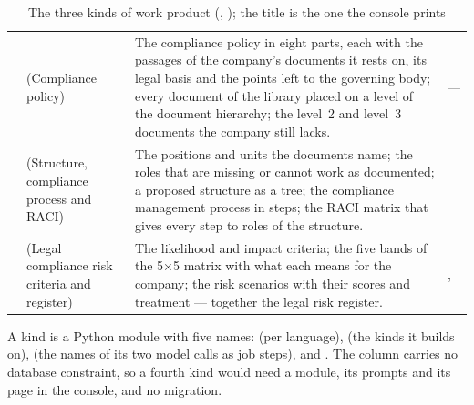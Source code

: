 \begin{table}[H]
\caption{The three kinds of work product (, ); the title is the one the console prints}\label{tab:programme:kinds}
\begin{tabularx}{\textwidth}{@{}L{19mm}L{37mm}YL{17mm}@{}}
\toprule
{} &  &  &  \\
\midrule
{} &  (Compliance policy) &
  The compliance policy in eight parts, each with the passages of the company's documents it
  rests on, its legal basis and the points left to the governing body; every document of the
  library placed on a level of the document hierarchy; the level~2 and level~3 documents the
  company still lacks. & --- \\
 &  (Structure, compliance process and RACI) &
  The positions and units the documents name; the roles that are missing or cannot work as
  documented; a proposed structure as a tree; the compliance management process in steps; the
  RACI matrix that gives every step to roles of the structure. &  \\
 &  (Legal compliance risk criteria and register) &
  The likelihood and impact criteria; the five bands of the 5×5 matrix with what each means
  for the company; the risk scenarios with their scores and treatment --- together the legal
  risk register. & ,  \\
\bottomrule
\end{tabularx}
\end{table}

A kind is a Python module with five names:  (per language),  (the
kinds it builds on),  (the names of its two model calls as job steps),
 and . The column
 carries no database constraint, so a fourth kind would need a module, its prompts
and its page in the console, and no migration.

